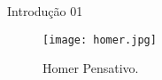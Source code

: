 Introdução 01

\begin{figure}[h]
    \centering
    \texttt{[image: homer.jpg]}
    \captionsetup{justification=centering}
    \caption{Homer Pensativo.}
    \label{fig:homerS}
\end{figure}